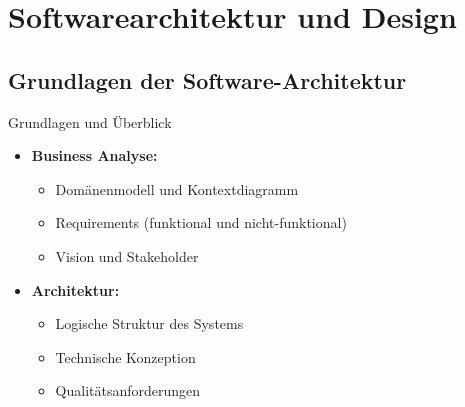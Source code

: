 \section{Softwarearchitektur und Design}

\subsection{Grundlagen der Software-Architektur}

\begin{concept}{Grundlagen und Überblick}
\begin{itemize}
    \item \textbf{Business Analyse:}
    \begin{itemize}
        \item Domänenmodell und Kontextdiagramm
        \item Requirements (funktional und nicht-funktional)
        \item Vision und Stakeholder
    \end{itemize}
    
    \item \textbf{Architektur:}
    \begin{itemize}
        \item Logische Struktur des Systems
        \item Technische Konzeption
        \item Qualitätsanforderungen
    \end{itemize}
\end{itemize}


\end{concept}
